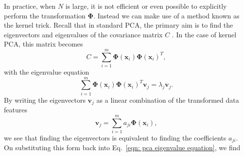 In practice, when $N$ is large, it is not efficient or even possible to explicitly perform the transformation $\bm{\Phi}$. Instead we can make use of a method known as the kernel trick. Recall that in standard PCA, the primary aim is to find the eigenvectors and eigenvalues of the covariance matrix $C$%
. In the case of kernel PCA, this matrix becomes 
\begin{equation}
    C = \sum_{i=1}^{m} \bm{\Phi}(\bm{x}_{i})\bm{\Phi}(\bm{x}_{i})^T,
\end{equation}
with the eigenvalue equation
\begin{equation}
    \sum_{i=1}^{m} \bm{\Phi}(\bm{x}_{i})\bm{\Phi}(\bm{x}_{i})^T \bm{v}_{j} = \lambda_{j}\bm{v}_{j}.
    \label{eqn: pca eigenvalue equation}
\end{equation}
By writing the eigenvectors $\bm{v}_{j}$ as a linear combination of the transformed data features
\begin{equation}
    \bm{v}_{j} = \sum_{i=1}^{m} a_{ji}\bm{\Phi}(\bm{x}_{i}),
\end{equation}
we see that finding the eigenvectors is equivalent to finding the coefficients $a_{ji}$. On substituting this form back into Eq.~\eqref{eqn: pca eigenvalue equation}, we find

